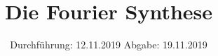 

\subject{V802}
\title{Die Fourier Synthese}
\date{%
  Durchführung: 12.11.2019
  \hspace{3em}
  Abgabe: 19.11.2019
}



\maketitle
\thispagestyle{empty}
\tableofcontents
\newpage





\printbibliography{}



